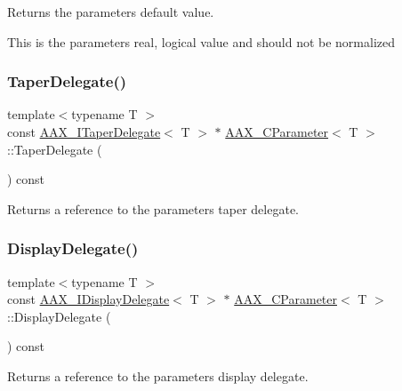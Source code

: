 Returns the parameter\textquotesingle{}s default value. 

This is the parameter\textquotesingle{}s real, logical value and should not be normalized \mbox{\label{a01537_aa0b6ab19d57453c198228c01028fd3a1}} 
\subsubsection{\texorpdfstring{TaperDelegate()}{TaperDelegate()}}
{\footnotesize\ttfamily template$<$typename T $>$ \\
const \mbox{\hyperlink{a01881}{A\+A\+X\+\_\+\+I\+Taper\+Delegate}}$<$ T $>$ $\ast$ \mbox{\hyperlink{a01537}{A\+A\+X\+\_\+\+C\+Parameter}}$<$ T $>$\+::Taper\+Delegate (\begin{DoxyParamCaption}{ }\end{DoxyParamCaption}) const}



Returns a reference to the parameter\textquotesingle{}s taper delegate. 

\mbox{\label{a01537_a6ae6348ec2a1fcc4422225c3329a302d}} 
\subsubsection{\texorpdfstring{DisplayDelegate()}{DisplayDelegate()}}
{\footnotesize\ttfamily template$<$typename T $>$ \\
const \mbox{\hyperlink{a01801}{A\+A\+X\+\_\+\+I\+Display\+Delegate}}$<$ T $>$ $\ast$ \mbox{\hyperlink{a01537}{A\+A\+X\+\_\+\+C\+Parameter}}$<$ T $>$\+::Display\+Delegate (\begin{DoxyParamCaption}{ }\end{DoxyParamCaption}) const}



Returns a reference to the parameter\textquotesingle{}s display delegate. 

\mbox{\label{a01537_af72fb87d6368888f8f97148705c0df3e}} 
